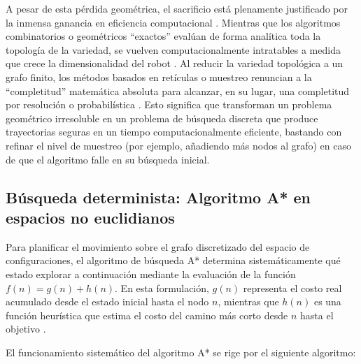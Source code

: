 A pesar de esta pérdida geométrica, el sacrificio está plenamente 
justificado por la inmensa ganancia en eficiencia computacional \parencite{choset2005principles}. 
Mientras que los algoritmos combinatorios o geométricos \enquote{exactos} evalúan 
de forma analítica toda la topología de la variedad, se vuelven 
computacionalmente intratables a medida que crece la dimensionalidad 
del robot \parencite{lavalle2006planning}. Al reducir la variedad topológica a un grafo finito, 
los métodos basados en retículas o muestreo renuncian a la 
\enquote{completitud} matemática absoluta para alcanzar, en su lugar, una completitud por 
resolución o probabilística \parencite{choset2005principles}. Esto significa que transforman 
un problema geométrico irresoluble en un problema de búsqueda 
discreta que produce trayectorias seguras en un tiempo computacionalmente 
eficiente, bastando con refinar el nivel de muestreo 
(por ejemplo, añadiendo más nodos al grafo) en caso de que el algoritmo falle 
en su búsqueda inicial.


\subsection{Búsqueda determinista: Algoritmo A* en espacios no euclidianos}

Para planificar el movimiento sobre el grafo discretizado del espacio de configuraciones, 
el algoritmo de búsqueda A* determina sistemáticamente qué estado explorar a continuación 
mediante la evaluación de la función $f(n) = g(n) + h(n)$. En esta formulación, $g(n)$ 
representa el costo real acumulado desde el estado inicial hasta el nodo $n$, mientras que 
$h(n)$ es una función heurística que estima el costo del camino más corto desde $n$ hasta 
el objetivo \parencite{choset2005principles}.

El funcionamiento sistemático del algoritmo A* se rige por el siguiente algoritmo:

